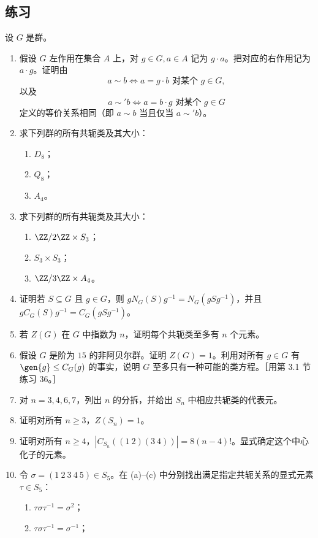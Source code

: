 \subsection*{练习}
设 $G$ 是群。
\begin{enumerate}[label=\arabic*.]
  \item 假设 $G$ 左作用在集合 $A$ 上，对 $g\in G,a\in A$ 记为 $g\cdot a$。把对应的右作用记为 $a\cdot g$。证明由
  \[
    a\sim b\Longleftrightarrow a=g\cdot b\text{ 对某个 }g\in G,
  \]
  以及
  \[
    a\sim' b\Longleftrightarrow a=b\cdot g\text{ 对某个 }g\in G
  \]
  定义的等价关系相同（即 $a\sim b$ 当且仅当 $a\sim' b$）。
  \item 求下列群的所有共轭类及其大小：
  \begin{enumerate}[label=(\alph*)]
    \item $D_8$；\item $Q_8$；\item $A_4$。
  \end{enumerate}
  \item 求下列群的所有共轭类及其大小：
  \begin{enumerate}[label=(\alph*)]
    \item $\ZZ/2\ZZ\times S_3$；\item $S_3\times S_3$；\item $\ZZ/3\ZZ\times A_4$。
  \end{enumerate}
  \item 证明若 $S\subseteq G$ 且 $g\in G$，则 $gN_G(S)g^{-1}=N_G(gSg^{-1})$，并且 $gC_G(S)g^{-1}=C_G(gSg^{-1})$。
  \item 若 $Z(G)$ 在 $G$ 中指数为 $n$，证明每个共轭类至多有 $n$ 个元素。
  \item 假设 $G$ 是阶为 $15$ 的非阿贝尔群。证明 $Z(G)=1$。利用对所有 $g\in G$ 有 $\gen{g}\leq C_G(g)$ 的事实，说明 $G$ 至多只有一种可能的类方程。［用第 3.1 节练习 36。］
  \item 对 $n=3,4,6,7$，列出 $n$ 的分拆，并给出 $S_n$ 中相应共轭类的代表元。
  \item 证明对所有 $n\geq3$，$Z(S_n)=1$。
  \item 证明对所有 $n\geq4$，$|C_{S_n}((1\ 2)(3\ 4))|=8(n-4)!$。显式确定这个中心化子的元素。
  \item 令 $\sigma=(1\ 2\ 3\ 4\ 5)\in S_5$。在 (a)--(c) 中分别找出满足指定共轭关系的显式元素 $\tau\in S_5$：
  \begin{enumerate}[label=(\alph*)]
    \item $\tau\sigma\tau^{-1}=\sigma^2$；
    \item $\tau\sigma\tau^{-1}=\sigma^{-1}$；

\end{enumerate}
\end{enumerate}
